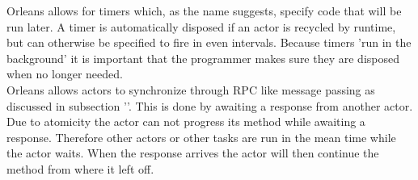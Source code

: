 Orleans allows for timers which, as the name suggests, specify code that will be run later. A timer is automatically disposed if an actor is recycled by runtime, but can otherwise be specified to fire in even intervals. Because timers 'run in the background' it is important that the programmer makes sure they are disposed when no longer needed.\\
Orleans allows actors to synchronize through RPC like message passing as discussed in subsection ''. This is done by awaiting a response from another actor. Due to atomicity the actor can not progress its method while awaiting a response. Therefore other actors or other tasks are run in the mean time while the actor waits. When the response arrives the actor will then continue the method from where it left off.